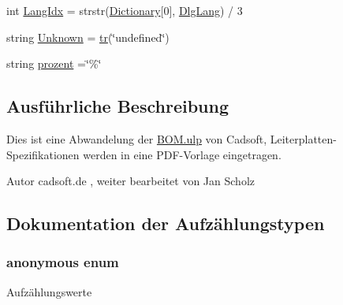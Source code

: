 \begin{DoxyCompactItemize}
\item 
int \hyperlink{_l_p-_daten_8ulp_a82c4a8df95cb51da553d4645b2de79d0}{Lang\+Idx} = strstr(\hyperlink{_l_p-_daten_8ulp_a82291247e79bbab858c4aa4dd4495d6b}{Dictionary}\mbox{[}0\mbox{]}, \hyperlink{_l_p-_daten_8ulp_a808b87f9418f3acfded801090fcadf74}{Dlg\+Lang}) / 3
\item 
string \hyperlink{_l_p-_daten_8ulp_a3757e4da4d101b9a9ac8b9cc77bcef5a}{Unknown} = \hyperlink{_l_p-_daten_8ulp_a47e53f1f76c0dfceedc0401335138268}{tr}(\char`\"{}undefined\char`\"{})
\item 
string \hyperlink{_l_p-_daten_8ulp_afdee5162eb7fe666bc58db923329bce0}{prozent} =\char`\"{}\%\char`\"{}
\end{DoxyCompactItemize}


\subsection{Ausführliche Beschreibung}
Dies ist eine Abwandelung der \hyperlink{bom_8ulp}{B\+O\+M.\+ulp} von Cadsoft, Leiterplatten-\/ Spezifikationen werden in eine P\+D\+F-\/\+Vorlage eingetragen. 

\begin{DoxyAuthor}{Autor}
cadsoft.\+de , weiter bearbeitet von Jan Scholz 
\end{DoxyAuthor}


\subsection{Dokumentation der Aufzählungstypen}
\hypertarget{_l_p-_daten_8ulp_a06fc87d81c62e9abb8790b6e5713c55b}{}\subsubsection[{anonymous enum}]{\setlength{\rightskip}{0pt plus 5cm}anonymous enum}\label{_l_p-_daten_8ulp_a06fc87d81c62e9abb8790b6e5713c55b}
\begin{Desc}
\item[Aufzählungswerte]\par
\begin{description}
\item[{\em 
\hypertarget{_l_p-_daten_8ulp_a06fc87d81c62e9abb8790b6e5713c55bae9de385ef6fe9bf3360d1038396b884c}{}false\label{_l_p-_daten_8ulp_a06fc87d81c62e9abb8790b6e5713c55bae9de385ef6fe9bf3360d1038396b884c}
}]\item[{\em 
\hypertarget{_l_p-_daten_8ulp_a06fc87d81c62e9abb8790b6e5713c55ba08f175a5505a10b9ed657defeb050e4b}{}true\label{_l_p-_daten_8ulp_a06fc87d81c62e9abb8790b6e5713c55ba08f175a5505a10b9ed657defeb050e4b}
}]\end{description}
\end{Desc}


